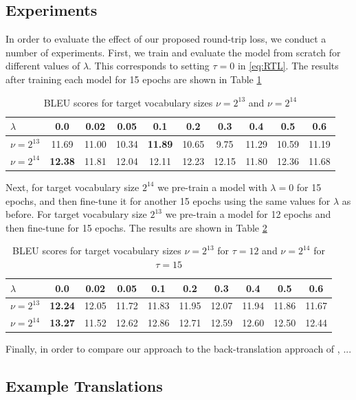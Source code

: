 \documentclass[11pt,a4paper]{article}
\begin{document}
\subsection{Experiments}
In order to evaluate the effect of our proposed round-trip loss, we conduct a number of experiments. First, we train and evaluate the model from scratch for different values of $\lambda$. This corresponds to setting $\tau=0$ in \eqref{eq:RTL}. The results after training each model for 15 epochs are shown in Table \ref{tab:result1}
\begin{table} [ht]
\centering
\small
\begin{tabular}{ l || c | c | c | c | c | c | c | c | c  }
  $\lambda$ & 0.0 & 0.02 & 0.05 & 0.1 & 0.2 & 0.3 & 0.4 & 0.5 & 0.6 \\ \hline
  $\nu=2^{13}$ & 11.69 & 11.00 & 10.34 & \textbf{11.89} & 10.65 & 9.75 & 11.29 & 10.59 & 11.19 \\
  $\nu=2^{14}$ & \textbf{12.38} & 11.81 & 12.04 & 12.11 & 12.23 & 12.15 & 11.80 & 12.36 & 11.68 \\
\end{tabular}
\caption{BLEU scores for target vocabulary sizes $\nu=2^{13}$ and $\nu=2^{14}$}
\label{tab:result1}
\end{table}


Next, for target vocabulary size $2^{14}$ we pre-train a model with $\lambda=0$ for 15 epochs, and then fine-tune it for another 15 epochs using the same values for $\lambda$ as before. For target vocabulary size $2^{13}$ we pre-train a model for 12 epochs and then fine-tune for 15 epochs. The results are shown in Table \ref{tab:result2}
\begin{table} [ht]
\centering
\small
\begin{tabular}{ l || c | c | c | c | c | c | c | c | c  }
  $\lambda$ & 0.0 & 0.02 & 0.05 & 0.1 & 0.2 & 0.3 & 0.4 & 0.5 & 0.6 \\ \hline
  $\nu=2^{13}$ & \textbf{12.24} & 12.05 & 11.72 & 11.83 & 11.95 & 12.07 & 11.94 & 11.86 & 11.67 \\
  $\nu=2^{14}$ & \textbf{13.27} & 11.52 & 12.62 & 12.86 & 12.71 & 12.59 & 12.60 & 12.50 & 12.44 \\
\end{tabular}
\caption{BLEU scores for target vocabulary sizes $\nu=2^{13}$ for $\tau=12$ and $\nu=2^{14}$ for $\tau=15$}
\label{tab:result2}
\end{table}
Finally, in order to compare our approach to the back-translation approach of \citet{backtrans}, ...
\subsection{Example Translations}
\end{document}
